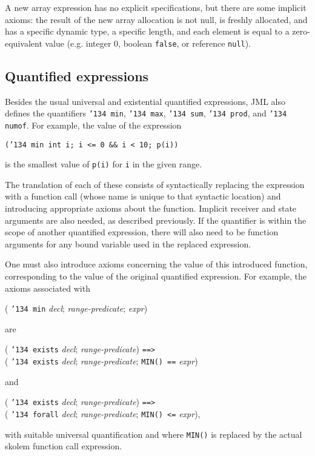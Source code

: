 \documentclass{sig-alternate}
\begin{document}
A new array expression has no explicit specifications, but there are some implicit axioms:
the result of the new array allocation is not null, is freshly allocated,
 and has a specific dynamic type, 
a specific length, and each
element is equal to a zero-equivalent value (e.g. integer 0, boolean \texttt{false}, or
reference \texttt{null}).

\subsection{Quantified expressions}

Besides
the usual universal and existential quantified expressions, JML
also defines the quantifiers \texttt{\char'134 min}, \texttt{\char'134 max}, 
\texttt{\char'134 sum}, \texttt{\char'134 prod}, and \texttt{\char'134 numof}.  
For example, the value of the expression
\begin{center} \texttt{(\char'134 min int i; i <= 0 \&\& i < 10; p(i))} \end{center}
is the smallest value of \texttt{p(i)} for \texttt{i} in the given range. 

The translation of each of these consists of syntactically replacing the expression with a
function call (whose name is unique to that syntactic location) and introducing appropriate axioms about the
function.  Implicit receiver and state arguments are also needed,
as described previously.  If the quantifier is within the scope of another quantified
expression, there will also need to be function arguments for any bound variable used
in the replaced expression.

One must also introduce axioms concerning the value of this introduced function, 
corresponding to the value of the original quantified expression.  For example, the
axioms associated with
\begin{center} ( \texttt{\char'134 min} {\em decl}; {\em range-predicate}; {\em expr}) \end{center}
are 
\begin{center} ( \texttt{\char'134 exists} {\em decl}; {\em range-predicate}) \texttt{==>} \\
( \texttt{\char'134 exists} {\em decl}; {\em range-predicate}; \texttt{MIN() ==} {\em expr}) \end{center}
and
\begin{center} ( \texttt{\char'134 exists} {\em decl}; {\em range-predicate}) \texttt{==>} \\
( \texttt{\char'134 forall} {\em decl}; {\em range-predicate}; \texttt{MIN() <=} {\em expr}), \end{center}
with suitable universal quantification and 
where \texttt{MIN()} is replaced by the actual skolem function call expression.
\end{document}
